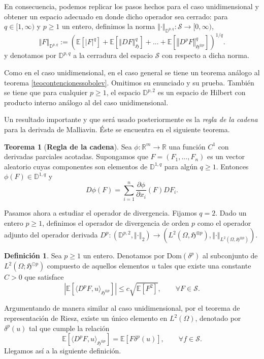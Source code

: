 \documentclass[letterpaper,twoside,12pt]{book}
\newcommand{\R}{\mathbb{R}}
\newcommand{\D}{\mathbb{D}}
\renewcommand{\S}{\mathcal{S}}
\newcommand{\E}{\mathbb{E}}
\newcommand{\1}{\mathds{1}}
\newcommand{\abs}[1]{\left\lvert #1 \right\rvert}
\renewcommand{\to}{\rightarrow}
\newcommand{\norm}[1]{\left\Vert #1 \right\Vert}
\theoremstyle{definition}
\newtheorem{dfn}{Definición}
\theoremstyle{definition}
\newtheorem{teo}{Teorema}
\theoremstyle{remark}
\theoremstyle{definition}
\theoremstyle{definition}
\theoremstyle{definition}
\theoremstyle{definition}
\theoremstyle{definition}
\begin{document}
En consecuencia, podemos replicar los pasos hechos para el caso unidimensional y obtener un espacio adecuado en donde dicho operador sea cerrado: para $q\in [1,\infty)$ y $p\geq1$ un entero, definimos la norma $\norm{\cdot}_{\D^{p,q}}:\S\to [0,\infty)$,
\[
\norm{F}_{\D^{p,q}}:= \left(\E\left[\abs{F}^{q}\right]+\E\left[\norm{DF}^{q}_{\mathfrak{H}}\right]+...+\E\left[\norm{D^pF}_{\mathfrak{H}^{\otimes p}}^q\right]\right)^{1/q}.
\]
y denotamos por $\D^{p,q}$ a la cerradura del espacio $\S$ con respecto a dicha norma. 

Como en el caso unidimensional, en el caso general se tiene un teorema análogo al teorema \ref{teocontencionessobolev}. Omitimos su enunciado y su prueba. También se tiene que para cualquier $p\geq1$, el espacio $\D^{p,2}$ es un espacio de Hilbert con producto interno análogo al del caso unidimensional.

Un resultado importante y que será usado posteriormente es la \textit{regla de la cadena} para la derivada de Malliavin. Éste se encuentra en el siguiente teorema.

\begin{teo}[\textbf{Regla de la cadena}]\label{reglacadena} 
 Sea $\phi:\R^{m}\to \R$ una función $C^1$ con derivadas parciales acotadas. Supongamos que $F=(F_1,...,F_n)$ es un vector aleatorio cuyas componentes son elementos de $\D^{1,q}$ para algún $q\geq1$. Entonces $\phi(F)\in \D^{1,q}$ y 
 \[
D\phi(F)=\sum_{i=1}^n \frac{\partial \phi}{\partial x_i}(F)DF_i.
 \]
 \end{teo}
Pasamos ahora a estudiar el operador de divergencia. Fijamos $q=2$. Dado un entero $p\geq1$, definimos el operador de divergencia de orden $p$ como el operador adjunto del operador derivada $D^{p}:\left(\D^{p,2}, \norm{\cdot}_{2}\right)\to \left(L^{2}(\Omega,\mathfrak{H}^{\otimes p}), \norm{\cdot}_{L^{2}(\Omega,\mathfrak{H}^{\otimes p})}\right)$.

\begin{dfn} 
 Sea $p\geq1$ un entero. Denotamos por $\text{Dom}(\delta^p)$ al subconjunto de $L^2(\Omega;\mathfrak{H}^{\odot p})$ compuesto de aquellos elementos $u$ tales que existe una constante $C>0$ que satisface 
 \[
 \abs{\E\left[\langle D^pF,u\rangle_{\mathfrak{H}^{\otimes p}}\right]}\leq c\sqrt{\E\left[F^2\right]}, \qquad \forall F \in \S.
 \]
 \end{dfn}
 Argumentando de manera similar al caso unidimensional, por el teorema de representación de Riesz, existe un único elemento en $L^2(\Omega)$, denotado por $\delta^p(u)$ tal que cumple la relación 
 \[
 \E\left[\langle D^pF,u\rangle_{\mathfrak{H}^{\otimes p}}\right]=\E\left[F\delta^{p}(u)\right], \qquad \forall f\in \S.
 \]
 Llegamos así a la siguiente definición.
\end{document}

